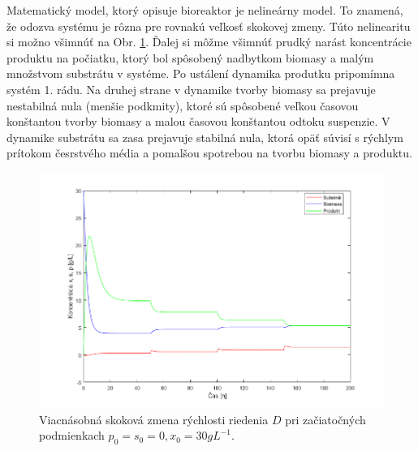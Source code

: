 Matematický model, ktorý opisuje bioreaktor je nelineárny model. To znamená, že odozva systému je rôzna pre rovnakú veľkosť skokovej zmeny. Túto nelinearitu si možno všimnúť na Obr. \ref{fig:1}. Ďalej si môžme všimnúť prudký narást koncentrácie produktu na počiatku, ktorý bol spôsobený nadbytkom biomasy a malým množstvom substrátu v systéme. Po ustálení dynamika produtku pripomímna systém 1. rádu. Na druhej strane v dynamike tvorby biomasy sa prejavuje nestabilná nula (menšie podkmity), ktoré sú spôsobené veľkou časovou konštantou tvorby biomasy a malou časovou konštantou odtoku suspenzie. V dynamike substrátu sa zasa prejavuje stabilná nula, ktorá opäť súvisí s rýchlym prítokom česrstvého média a pomalšou spotrebou na tvorbu biomasy a produktu.

\begin{figure}[H]
	\centering
	\includegraphics[width=1\linewidth]{images/step_change}
	\caption[]{Viacnásobná skoková zmena rýchlosti riedenia $D$ pri začiatočných podmienkach $p_0 = s_0 = 0, x_0 = 30 gL^{-1}$.}
	\label{fig:1}
\end{figure}

